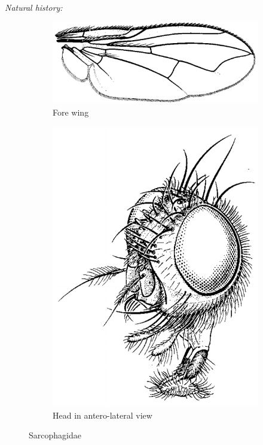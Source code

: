 \documentclass[letterpaper, 11pt]{article}
\begin{document}
\noindent{}\textit{Natural history:} \\

\begin{figure}[ht!]
    \centering
    \begin{subfigure}[ht!]{0.5\textwidth}
        \includegraphics[width=\textwidth]{SarcophagidWing}
        \caption{Fore wing \citep[][Fig. 116.30]{mcalpine1981manualv2}}
        \label{fig:sarcoph1}
    \end{subfigure}
    \qquad
    \begin{subfigure}[ht!]{0.25\textwidth}
        \includegraphics[width=\textwidth]{SarcophagidHead}
        \caption{Head in antero-lateral view \citep[][Fig. 116.13]{mcalpine1981manualv2}}
        \label{fig:sarcoph2}
    \end{subfigure}
    \caption{Sarcophagidae}\label{fig:sarcophs}
\end{figure}
\end{document}
